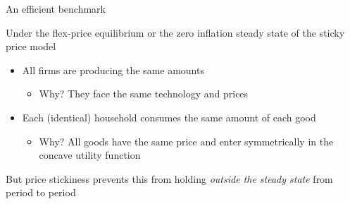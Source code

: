 
	
\begin{frame}{An efficient benchmark}

Under the flex-price equilibrium or the zero inflation steady state of the sticky price model
\vspace{2mm}
\begin{itemize}
\item	All firms are producing the same amounts
	\begin{itemize}
	\item	Why? They face the same technology and prices
	\end{itemize}
\item	Each (identical) household consumes the same amount of each good
	\begin{itemize}
	\item	Why? All goods have the same price and enter symmetrically in the concave utility function
	\end{itemize}
\end{itemize}

\vspace{3mm}
But price stickiness prevents this from holding \textit{outside the steady state} from period to period

\end{frame}


	
